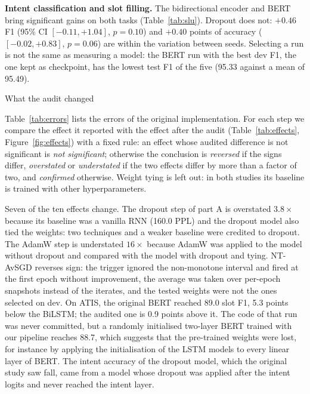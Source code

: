 \documentclass[10pt,twocolumn,a4paper]{article}
\makeatletter
\renewcommand\section{\@startsection{section}{1}{\z@}{-7pt plus -2pt minus -1pt}{3pt}%
  {\normalfont\normalsize\bfseries}}
\newcommand{\para}[1]{\textbf{#1}\hspace{0.4em}}
\makeatother
\begin{document}
\para{Intent classification and slot filling.} The bidirectional encoder and BERT bring significant gains on both
tasks (Table~\ref{tab:slu}). Dropout does not: $+0.46$ F1 (95\% CI $[-0.11, +1.04]$, $p=0.10$) and $+0.40$ points
of accuracy ($[-0.02, +0.83]$, $p=0.06$) are within the variation between seeds. Selecting a run is not the same
as measuring a model: the BERT run with the best dev F1, the one kept as checkpoint, has the lowest test F1 of the
five (95.33 against a mean of 95.49).





\section{What the audit changed}
\label{sec:audit}


Table~\ref{tab:errors} lists the errors of the original implementation. For each step we compare the effect it
reported with the effect after the audit (Table~\ref{tab:effects}, Figure~\ref{fig:effects}) with a fixed rule: an
effect whose audited difference is not significant is \emph{not significant}; otherwise the conclusion is
\emph{reversed} if the signs differ, \emph{overstated} or \emph{understated} if the two effects differ by more than
a factor of two, and \emph{confirmed} otherwise. Weight tying is left out: in both studies its baseline is trained
with other hyperparameters.

Seven of the ten effects change. The dropout step of part A is overstated $3.8\times$ because its baseline was a
vanilla RNN (160.0 PPL) and the dropout model also tied the weights: two techniques and a weaker baseline were
credited to dropout. The AdamW step is understated $16\times$ because AdamW was applied to the model without
dropout and compared with the model with dropout and tying. NT-AvSGD reverses sign: the trigger ignored the
non-monotone interval and fired at the first epoch without improvement, the average was taken over per-epoch
snapshots instead of the iterates, and the tested weights were not the ones selected on dev. On ATIS, the
original BERT reached 89.0 slot F1, 5.3 points below the BiLSTM; the audited one is 0.9 points above it. The code
of that run was never committed, but a randomly initialised two-layer BERT trained with our pipeline reaches 88.7,
which suggests that the pre-trained weights were lost, for instance by applying the initialisation of the LSTM
models to every linear layer of BERT. The intent accuracy of the dropout model, which the original study saw fall,
came from a model whose dropout was applied after the intent logits and never reached the intent layer.
\end{document}

